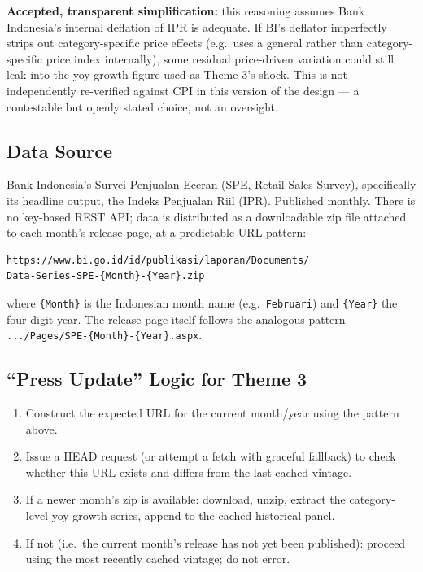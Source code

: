 \documentclass[11pt]{article}
\begin{document}
\begin{warningbox}
\textbf{Accepted, transparent simplification:} this reasoning assumes Bank
Indonesia's internal deflation of IPR is adequate. If BI's deflator
imperfectly strips out category-specific price effects (e.g.\ uses a
general rather than category-specific price index internally), some
residual price-driven variation could still leak into the yoy growth figure
used as Theme 3's shock. This is not independently re-verified against CPI
in this version of the design --- a contestable but openly stated choice,
not an oversight.
\end{warningbox}

\subsection{Data Source}

Bank Indonesia's Survei Penjualan Eceran (SPE, Retail Sales Survey),
specifically its headline output, the Indeks Penjualan Riil (IPR). Published
monthly. There is no key-based REST API; data is distributed as a
downloadable zip file attached to each month's release page, at a
predictable URL pattern:
\begin{verbatim}
https://www.bi.go.id/id/publikasi/laporan/Documents/
Data-Series-SPE-{Month}-{Year}.zip
\end{verbatim}
where \texttt{\{Month\}} is the Indonesian month name (e.g.\ \texttt{Februari})
and \texttt{\{Year\}} the four-digit year. The release page itself follows the
analogous pattern \texttt{.../Pages/SPE-\{Month\}-\{Year\}.aspx}.

\subsection{``Press Update'' Logic for Theme 3}

\begin{enumerate}
  \item Construct the expected URL for the current month/year using the
  pattern above.
  \item Issue a HEAD request (or attempt a fetch with graceful fallback) to
  check whether this URL exists and differs from the last cached vintage.
  \item If a newer month's zip is available: download, unzip, extract the
  category-level yoy growth series, append to the cached historical panel.
  \item If not (i.e.\ the current month's release has not yet been
  published): proceed using the most recently cached vintage; do not error.
\end{enumerate}
\end{document}
